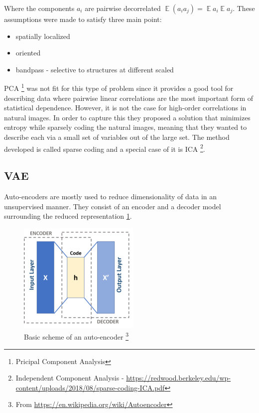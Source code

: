 \documentclass[12pt, english]{article}
\DeclareMathOperator*{\E}{\mathbb{E}}
\begin{document}
\vspace{4mm}

\par Where the components $a_{i}$ are pairwise decorrelated $\E (a_i a_j) = \E a_i \E a_j$. These assumptions were made to satisfy three main point:

\vspace{4mm}

\begin{itemize}
    \item spatially localized
    \item oriented
    \item bandpass - selective to structures at different scaled
\end{itemize}

\vspace{4mm}

\par PCA \footnote{Pricipal Component Analysis} was not fit for this type of problem since it provides a good tool for describing data where pairwise linear correlations are the most important form of statistical dependence. However, it is not the case for high-order correlations in natural images. In order to capture this they proposed a solution that minimizes entropy while sparsely coding the natural images, meaning that they wanted to describe each via a small set of variables out of the large set. The method developed is called sparse coding and a special case of it is ICA \footnote{Independent Component Analysis - \url{https://redwood.berkeley.edu/wp-content/uploads/2018/08/sparse-coding-ICA.pdf}}.

\vspace{5mm}

\subsection{VAE}

\vspace{5mm}

\par Auto-encoders are mostly used to reduce dimensionality of data in an unsupervised manner. They consist of an encoder and a decoder model surrounding the reduced representation \ref{fig:auto_encoder_scheme}. 

\vspace{4mm}

\begin{figure}[H]
    \centering
    \includegraphics[width=0.3\linewidth]{220px-Autoencoder_schema.png}
    \caption{Basic scheme of an auto-encoder \footnote{From \url{https://en.wikipedia.org/wiki/Autoencoder}}}
    \label{fig:auto_encoder_scheme}
\end{figure}
\end{document}
